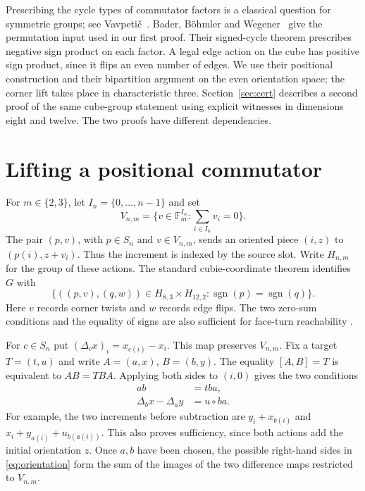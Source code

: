 \documentclass[11pt,letterpaper]{article}
\theoremstyle{definition}
\theoremstyle{remark}
\newcommand{\F}{\mathbb F}
\newcommand{\sgn}{\operatorname{sgn}}
\newcommand{\cl}[2]{[#1,#2]}
\begin{document}
Prescribing the cycle types of commutator factors is a classical question
for symmetric groups; see Vavpeti\v{c}~\cite{vavpetic}. Bader, B\"ohmler and
Wegener~\cite[Theorem~3.1 and Proposition~3.4]{bbw} give the permutation
input used in our first proof. Their signed-cycle theorem prescribes
negative sign product on each factor. A legal edge action on the cube
has positive sign product, since it flips an even number of edges.
We use their positional construction and their bipartition argument on
the even orientation space; the corner lift takes place in characteristic
three. Section~\ref{sec:cert} describes a second proof of the same
cube-group statement using explicit witnesses in dimensions eight and
twelve. The two proofs have different dependencies.

\section{Lifting a positional commutator}\label{sec:lift}

For \(m\in\{2,3\}\), let \(I_n=\{0,\ldots,n-1\}\) and set
\[
 V_{n,m}=\{v\in\F_m^{I_n}:\textstyle\sum_{i\in I_n}v_i=0\}.
\]
The pair \((p,v)\), with \(p\in S_n\) and \(v\in V_{n,m}\), sends an
oriented piece \((i,z)\) to \((p(i),z+v_i)\). Thus the increment is
indexed by the source slot. Write \(H_{n,m}\) for the group of these
actions. The standard cubie-coordinate theorem identifies \(G\) with
\begin{equation}\label{eq:cube}
 \big\{((p,v),(q,w))\in H_{8,3}\times H_{12,2}:
                       \sgn(p)=\sgn(q)\big\}.
\end{equation}
Here \(v\) records corner twists and \(w\) records edge flips. The two
zero-sum conditions and the equality of signs are also sufficient for
face-turn reachability \cite[\S3]{sun}.

For \(c\in S_n\) put \((\Delta_c x)_i=x_{c(i)}-x_i\). This map preserves
\(V_{n,m}\). Fix a target \(T=(t,u)\) and write \(A=(a,x)\), \(B=(b,y)\).
The equality \(\cl{A}{B}=T\) is equivalent to \(AB=TBA\). Applying both
sides to \((i,0)\) gives the two conditions
\begin{align}
 ab&=tba, \label{eq:position}\\
 \Delta_b x-\Delta_a y&=u\circ ba. \label{eq:orientation}
\end{align}
For example, the two increments before subtraction are
\(y_i+x_{b(i)}\) and \(x_i+y_{a(i)}+u_{b(a(i))}\). This also proves
sufficiency, since both actions add the initial orientation \(z\).
Once \(a,b\) have been chosen, the possible right-hand sides in
\eqref{eq:orientation} form the sum of the images of the two difference
maps restricted to \(V_{n,m}\).
\end{document}
